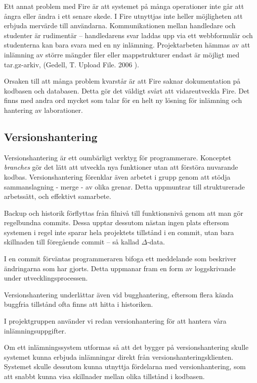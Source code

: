 Ett annat problem med Fire är att systemet på många operationer inte går att ångra eller ändra i ett senare skede. 
I Fire utnyttjas inte heller möjligheten att erbjuda mervärde till användarna. Kommunikationen mellan handledare och studenter är rudimentär – handledarens svar laddas upp via ett webbformulär och studenterna kan bara svara med en ny inlämning. Projektarbeten hämmas av att inlämning av större mängder filer eller mappstrukturer endast är möjligt med tar.gz-arkiv, (Gedell, T. Upload File. 2006 ).

Orsaken till att många problem kvarstår är att Fire saknar dokumentation på kodbasen och databasen. Detta gör det väldigt svårt att vidareutveckla Fire.
Det finns med andra ord mycket som talar för en helt ny lösning för inlämning och hantering av laborationer.

\subsection{Versionshantering}

Versionshantering är ett oumbärligt verktyg för programmerare. Konceptet \emph{branches} gör det lätt att utveckla nya funktioner utan att förstöra nuvarande kodbas. Versionshantering förenklar även arbetet i grupp genom att  stödja sammanslagning - merge - av olika grenar. Detta uppmuntrar till strukturerade arbetssätt, och effektivt samarbete. 

Backup och historik förflyttas från filnivå till funktionsnivå genom att man gör regelbundna commits. Dessa upptar dessutom nästan ingen plats eftersom systemen i regel inte sparar hela projektets tillstånd i en commit, utan bara skillnaden till föregående commit – så kallad $\Delta$-data.

I en commit förväntas programmeraren bifoga ett meddelande som beskriver ändringarna som har gjorts. Detta uppmanar fram en form av loggskrivande under utvecklingsprocessen.

Versionshantering underlättar även vid bugghantering, eftersom flera kända buggfria tillstånd ofta finns att hitta i historiken.

I projektgruppen använder vi redan versionhantering för att hantera våra inlämningsuppgifter.

Om ett inlämningssystem utformas så att det bygger på versionshantering skulle systemet kunna erbjuda inlämningar direkt från versionshanteringsklienten. Systemet skulle dessutom kunna utnyttja fördelarna med versionhantering, som att snabbt kunna visa skillnader mellan olika tillstånd i kodbasen.

